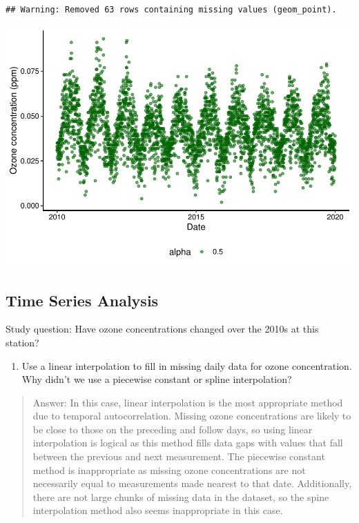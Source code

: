 \documentclass[]{article}
\providecommand{\tightlist}{%
  \setlength{\itemsep}{0pt}\setlength{\parskip}{0pt}}
\begin{document}
\begin{verbatim}
## Warning: Removed 63 rows containing missing values (geom_point).
\end{verbatim}

\includegraphics{A08_TimeSeries_files/figure-latex/unnamed-chunk-3-1.pdf}

\hypertarget{time-series-analysis}{%
\subsection{Time Series Analysis}\label{time-series-analysis}}

Study question: Have ozone concentrations changed over the 2010s at this
station?

\begin{enumerate}
\def\labelenumi{\arabic{enumi}.}
\setcounter{enumi}{7}
\tightlist
\item
  Use a linear interpolation to fill in missing daily data for ozone
  concentration. Why didn't we use a piecewise constant or spline
  interpolation?
\end{enumerate}

\begin{quote}
Answer: In this case, linear interpolation is the most appropriate
method due to temporal autocorrelation. Missing ozone concentrations are
likely to be close to those on the preceding and follow days, so using
linear interpolation is logical as this method fills data gaps with
values that fall between the previous and next measurement. The
piecewise constant method is inappropriate as missing ozone
concentrations are not necessarily equal to measurements made nearest to
that date. Additionally, there are not large chunks of missing data in
the dataset, so the spine interpolation method also seems inappropriate
in this case.
\end{quote}
\end{document}
